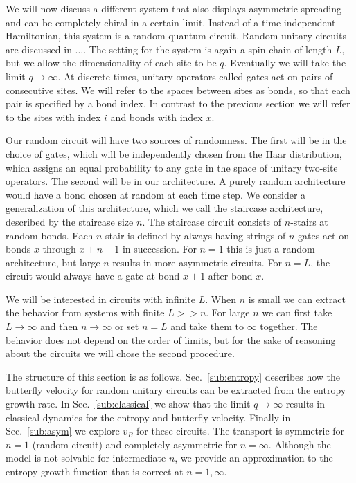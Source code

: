 \documentclass[aps,prx,reprint,superscriptaddress, longbibliography]{revtex4-1}
\begin{document}
We will now discuss a different system that also displays asymmetric spreading and can be completely chiral in a certain limit. Instead of a time-independent Hamiltonian, this system is a random quantum circuit. Random unitary circuits are discussed in .... The setting for the system is again a spin chain of length $L$, but we allow the dimensionality of each site to be $q$. Eventually we will take the limit $q\to\infty$. At discrete times, unitary operators called gates act on pairs of consecutive sites. We will refer to the spaces between sites as bonds, so that each pair is specified by a bond index. In contrast to the previous section we will refer to the sites with index $i$ and bonds with index $x$. 

Our random circuit will have two sources of randomness. The first will be in the choice of gates, which will be independently chosen from the Haar distribution, which assigns an equal probability to any gate in the space of unitary two-site operators. The second will be in our architecture. A purely random architecture would have a bond chosen at random at each time step. We consider a generalization of this architecture, which we call the staircase architecture, described by the staircase size $n$. The staircase circuit consists of $n$-stairs at random bonds. 
Each $n$-stair is defined by always having strings of $n$ gates act on bonds $x$ through $x+n-1$ in succession. For $n=1$ this is just a random architecture, but large $n$ results in more asymmetric circuits. For $n=L$, the circuit would always have a gate at bond $x+1$ after bond $x$.

We will be interested in circuits with infinite $L$. When $n$ is small we can extract the behavior from systems with finite $L>>n$. For large $n$ we can first take $L\to\infty$ and then $n\to\infty$ or set $n=L$ and take them to $\infty$ together. The behavior does not depend on the order of limits, but for the sake of reasoning about the circuits we will chose the second procedure.

The structure of this section is as follows. Sec.~\ref{sub:entropy} describes how the butterfly velocity for random unitary circuits can be extracted from the entropy growth rate. In Sec.~\ref{sub:classical} we show that the limit $q\to\infty$ results in classical dynamics for the entropy and butterfly velocity. Finally in Sec.~\ref{sub:asym} we explore $v_B$ for these circuits. The transport is symmetric for $n=1$ (random circuit) and completely asymmetric for $n=\infty$. Although the model is not solvable for intermediate $n$, we provide an approximation to the entropy growth function that is correct at $n=1, \infty$.
\end{document}
